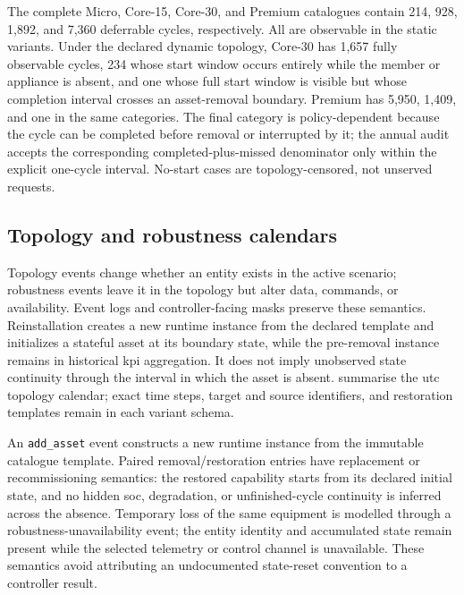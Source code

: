The complete Micro, Core-15, Core-30, and Premium catalogues contain 214, 928, 1,892, and 7,360 deferrable cycles, respectively. All are observable in the static variants. Under the declared dynamic topology, Core-30 has 1,657 fully observable cycles, 234 whose start window occurs entirely while the member or appliance is absent, and one whose full start window is visible but whose completion interval crosses an asset-removal boundary. Premium has 5,950, 1,409, and one in the same categories. The final category is policy-dependent because the cycle can be completed before removal or interrupted by it; the annual audit accepts the corresponding completed-plus-missed denominator only within the explicit one-cycle interval. No-start cases are topology-censored, not unserved requests.

\subsection{Topology and robustness calendars}

Topology events change whether an entity exists in the active scenario; robustness events leave it in the topology but alter data, commands, or availability. Event logs and controller-facing masks preserve these semantics. Reinstallation creates a new runtime instance from the declared template and initializes a stateful asset at its boundary state, while the pre-removal instance remains in historical \gls{kpi} aggregation. It does not imply unobserved state continuity through the interval in which the asset is absent.  summarise the \gls{utc} topology calendar; exact time steps, target and source identifiers, and restoration templates remain in each variant schema.

An \texttt{add\_asset} event constructs a new runtime instance from the immutable catalogue template. Paired removal/restoration entries have replacement or recommissioning semantics: the restored capability starts from its declared initial state, and no hidden \gls{soc}, degradation, or unfinished-cycle continuity is inferred across the absence. Temporary loss of the same equipment is modelled through a robustness-unavailability event; the entity identity and accumulated state remain present while the selected telemetry or control channel is unavailable. These semantics avoid attributing an undocumented state-reset convention to a controller result.

